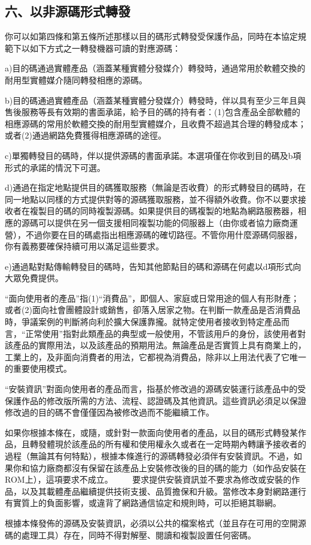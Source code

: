 \subsection{六、以非源碼形式轉發}
你可以如第四條和第五條所述那樣以目的碼形式轉發受保護作品，同時在本協定規範下以如下方式之一轉發機器可讀的對應源碼：\par
a)目的碼通過實體產品（涵蓋某種實體分發媒介）轉發時，通過常用於軟體交換的耐用型實體媒介隨同轉發相應的源碼。\par
b)目的碼通過實體產品（涵蓋某種實體分發媒介）轉發時，伴以具有至少三年且與售後服務等長有效期的書面承諾，給予目的碼的持有者：(1)包含產品全部軟體的相應源碼的常用於軟體交換的耐用型實體媒介，且收費不超過其合理的轉發成本；或者(2)通過網路免費獲得相應源碼的途徑。\par
c)單獨轉發目的碼時，伴以提供源碼的書面承諾。本選項僅在你收到目的碼及b項形式的承諾的情況下可選。\par
d)通過在指定地點提供目的碼獲取服務（無論是否收費）的形式轉發目的碼時，在同一地點以同樣的方式提供對等的源碼獲取服務，並不得額外收費。你不以要求接收者在複製目的碼的同時複製源碼。如果提供目的碼複製的地點為網路服務器，相應的源碼可以提供在另一個支援相同複製功能的伺服器上（由你或者協力廠商運營），不過你要在目的碼處指出相應源碼的確切路徑。不管你用什麼源碼伺服器，你有義務要確保持續可用以滿足這些要求。\par
e)通過點對點傳輸轉發目的碼時，告知其他節點目的碼和源碼在何處以d項形式向大眾免費提供。\par
“面向使用者的產品”指(1)“消費品”，即個人、家庭或日常用途的個人有形財產；或者(2)面向社會團體設計或銷售，卻落入居家之物。在判斷一款產品是否消費品時，爭議案例的判斷將向利於擴大保護靠攏。就特定使用者接收到特定產品而言，“正常使用”指對此類產品的典型或一般使用，不管該用戶的身份，該使用者對該產品的實際用法，以及該產品的預期用法。無論產品是否實質上具有商業上的，工業上的，及非面向消費者的用法，它都視為消費品，除非以上用法代表了它唯一的重要使用模式。\par
“安裝資訊”對面向使用者的產品而言，指基於修改過的源碼安裝運行該產品中的受保護作品的修改版所需的方法、流程、認證碼及其他資訊。這些資訊必須足以保證修改過的目的碼不會僅僅因為被修改過而不能繼續工作。\par
如果你根據本條在，或隨，或針對一款面向使用者的產品，以目的碼形式轉發某作品，且轉發體現於該產品的所有權和使用權永久或者在一定時期內轉讓予接收者的過程（無論其有何特點），根據本條進行的源碼轉發必須伴有安裝資訊。不過，如果你和協力廠商都沒有保留在該產品上安裝修改後的目的碼的能力（如作品安裝在ROM上），這項要求不成立。 　　要求提供安裝資訊並不要求為修改或安裝的作品，以及其載體產品繼續提供技術支援、品質擔保和升級。當修改本身對網路運行有實質上的負面影響，或違背了網路通信協定和規則時，可以拒絕其聯網。\par
根據本條發佈的源碼及安裝資訊，必須以公共的檔案格式（並且存在可用的空開源碼的處理工具）存在，同時不得對解壓、閱讀和複製設置任何密碼。
